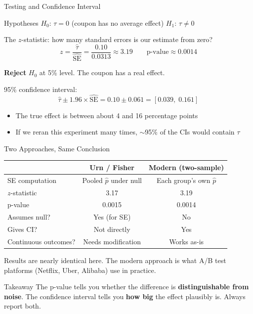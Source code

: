\documentclass[aspectratio=169, 11pt, handout]{beamer}
\newcommand{\SE}{\mathrm{SE}}
\begin{document}
\begin{frame}{Testing and Confidence Interval}

\begin{block}{Hypotheses}
$H_0$: $\tau = 0$ (coupon has no average effect) \qquad $H_1$: $\tau \neq 0$
\end{block}

\medskip

The $z$-statistic: how many standard errors is our estimate from zero?
\[
z = \frac{\hat{\tau}}{\widehat{\SE}} = \frac{0.10}{0.0313} \approx 3.19 \qquad \text{p-value} \approx 0.0014
\]

\pause

\textbf{Reject} $H_0$ at 5\% level. The coupon has a real effect.

\medskip

95\% confidence interval:
\[
\hat{\tau} \pm 1.96 \times \widehat{\SE} = 0.10 \pm 0.061 = [0.039, \; 0.161]
\]

\begin{itemize}
    \item The true effect is between about 4 and 16 percentage points
    \item If we reran this experiment many times, $\sim$95\% of the CIs would contain $\tau$
\end{itemize}
\end{frame}

\begin{frame}{Two Approaches, Same Conclusion}

\begin{center}
\small
\begin{tabular}{lcc}
\toprule
& \textbf{Urn / Fisher} & \textbf{Modern (two-sample)} \\
\midrule
SE computation & Pooled $\hat{p}$ under null & Each group's own $\hat{p}$ \\
$z$-statistic & 3.17 & 3.19 \\
p-value & 0.0015 & 0.0014 \\
Assumes null? & Yes (for SE) & No \\
Gives CI? & Not directly & Yes \\
Continuous outcomes? & Needs modification & Works as-is \\
\bottomrule
\end{tabular}
\end{center}

\medskip

Results are nearly identical here. The modern approach is what A/B test platforms (Netflix, Uber, Alibaba) use in practice.

\medskip

\begin{block}{Takeaway}
The p-value tells you whether the difference is \textbf{distinguishable from noise}. The confidence interval tells you \textbf{how big} the effect plausibly is. Always report both.
\end{block}
\end{frame}
\end{document}
